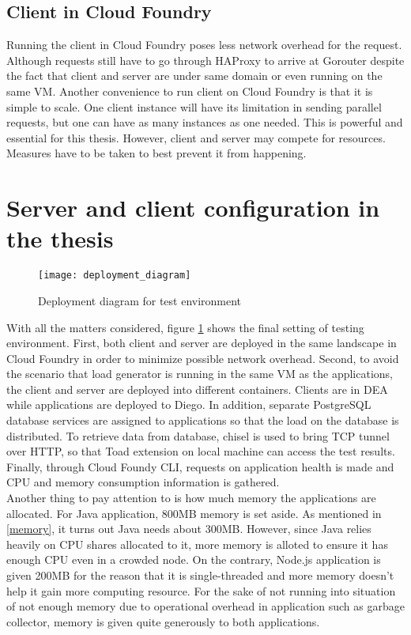 \subsection{Client in Cloud Foundry}
Running the client in Cloud Foundry poses less network overhead for the request. Although requests still have to go through HAProxy to arrive at Gorouter despite the fact that client and server are under same domain or even running on the same VM. Another convenience to run client on Cloud Foundry is that it is simple to scale. One client instance will have its limitation in sending parallel requests, but one can have as many instances as one needed. This is powerful and essential for this thesis. However, client and server may compete for resources. Measures have to be taken to best prevent it from happening. 

\section{Server and client configuration in the thesis}
\begin{figure}[h]
	\centering
	\texttt{[image: deployment\_diagram]}
	\caption{Deployment diagram for test environment}
	\label{deployment-diagram}
\end{figure}
With all the matters considered, figure \ref{deployment-diagram} shows the final setting of testing environment. First, both client and server are deployed in the same landscape in Cloud Foundry in order to minimize possible network overhead. Second, to avoid the scenario that load generator is running in the same VM as the applications, the client and server are deployed into different containers. Clients are in DEA while applications are deployed to Diego. In addition, separate PostgreSQL database services are assigned to applications so that the load on the database is distributed. To retrieve data from database, chisel is used to bring TCP tunnel over HTTP, so that Toad extension on local machine can access the test results. Finally, through Cloud Foundy CLI, requests on application health is made and CPU and memory consumption information is gathered. \\
Another thing to pay attention to is how much memory the applications are allocated. For Java application, 800MB memory is set aside. As mentioned in \ref{memory}, it turns out Java needs about 300MB. However, since Java relies heavily on CPU shares allocated to it, more memory is alloted to ensure it has enough CPU even in a crowded node. On the contrary, Node.js application is given 200MB for the reason that it is single-threaded and more memory doesn't help it gain more computing resource. For the sake of not running into situation of not enough memory due to operational overhead in application such as garbage collector, memory is given quite generously to both applications.  



